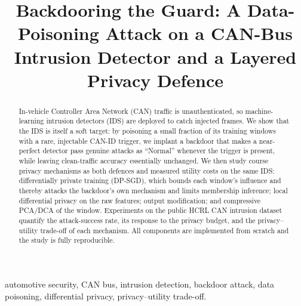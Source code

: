 \documentclass[conference]{IEEEtran}
\begin{document}
\title{Backdooring the Guard: A Data-Poisoning Attack on a CAN-Bus Intrusion
Detector and a Layered Privacy Defence}
\author{
}
\maketitle

\begin{abstract}
In-vehicle Controller Area Network (CAN) traffic is unauthenticated, so
machine-learning intrusion detectors (IDS) are deployed to catch injected frames.
We show that the IDS is itself a soft target: by poisoning a small fraction of its
training windows with a rare, injectable CAN-ID trigger, we implant a backdoor
that makes a near-perfect detector pass genuine attacks as ``Normal'' whenever the
trigger is present, while leaving clean-traffic accuracy essentially unchanged. We
then study course privacy mechanisms as both defences and measured utility costs
on the same IDS: differentially private training (DP-SGD), which bounds each
window's influence and thereby attacks the backdoor's own mechanism and limits
membership inference; local differential privacy on the raw features; output
modification; and compressive PCA/DCA of the window. Experiments on the public
HCRL CAN intrusion dataset quantify the attack-success rate, its response to the
privacy budget, and the privacy--utility trade-off of each mechanism. All
components are implemented from scratch and the study is fully reproducible.
\end{abstract}
\begin{IEEEkeywords}
automotive security, CAN bus, intrusion detection, backdoor attack, data
poisoning, differential privacy, privacy--utility trade-off.
\end{IEEEkeywords}
\end{document}
